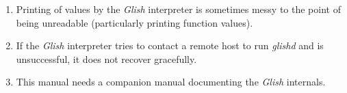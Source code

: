 \begin{enumerate}
\item Printing of values by the \emph{Glish} interpreter is sometimes
messy to the point of being unreadable (particularly printing
function values).

\item If the \emph{Glish} interpreter tries to contact a remote host to
run \emph{glishd} and is unsuccessful, it does not recover gracefully.

\item This manual needs a companion manual documenting
the \emph{Glish} internals.

\end{enumerate}


